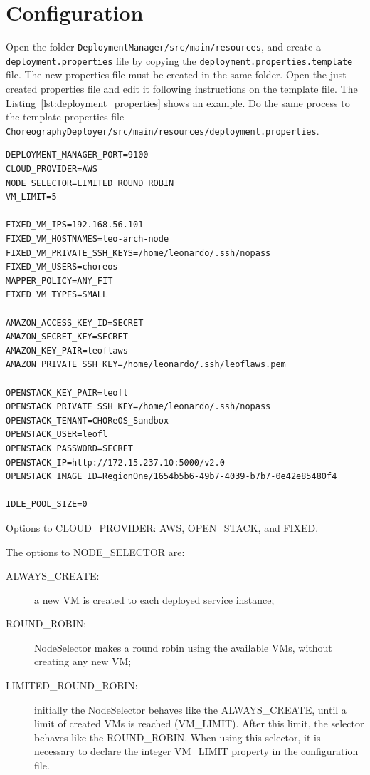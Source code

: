 \section{Configuration}

Open the folder \texttt{DeploymentManager/src/main/resources}, and create a \texttt{deployment.properties} file by copying the \texttt{deployment.properties.template} file. The new properties file must be created in the same folder. Open the just created properties file and edit it following instructions on the template file. The Listing~\ref{lst:deployment_properties} shows an example. Do the same process to the template properties file \texttt{ChoreographyDeployer/src/main/resources/deployment.properties}.

\lstset{
numbers=left
}

{\footnotesize
\begin{lstlisting}[caption=deployment.properties example,label=lst:deployment_properties] 
DEPLOYMENT_MANAGER_PORT=9100
CLOUD_PROVIDER=AWS
NODE_SELECTOR=LIMITED_ROUND_ROBIN
VM_LIMIT=5

FIXED_VM_IPS=192.168.56.101
FIXED_VM_HOSTNAMES=leo-arch-node
FIXED_VM_PRIVATE_SSH_KEYS=/home/leonardo/.ssh/nopass
FIXED_VM_USERS=choreos
MAPPER_POLICY=ANY_FIT
FIXED_VM_TYPES=SMALL

AMAZON_ACCESS_KEY_ID=SECRET
AMAZON_SECRET_KEY=SECRET
AMAZON_KEY_PAIR=leoflaws
AMAZON_PRIVATE_SSH_KEY=/home/leonardo/.ssh/leoflaws.pem

OPENSTACK_KEY_PAIR=leofl
OPENSTACK_PRIVATE_SSH_KEY=/home/leonardo/.ssh/nopass
OPENSTACK_TENANT=CHOReOS_Sandbox
OPENSTACK_USER=leofl
OPENSTACK_PASSWORD=SECRET
OPENSTACK_IP=http://172.15.237.10:5000/v2.0
OPENSTACK_IMAGE_ID=RegionOne/1654b5b6-49b7-4039-b7b7-0e42e85480f4

IDLE_POOL_SIZE=0

\end{lstlisting}
}

Options to CLOUD\_PROVIDER: AWS, OPEN\_STACK, and FIXED.

The options to NODE\_SELECTOR are: 

\begin{description}
\item [ALWAYS\_CREATE:] a new VM is created to each deployed service instance;
\item [ROUND\_ROBIN:] \textsf{NodeSelector} makes a round robin using the available VMs, without creating any new VM;
\item [LIMITED\_ROUND\_ROBIN:] initially the \textsf{NodeSelector} behaves like the ALWAYS\_CREATE, until a limit of created VMs is reached (VM\_LIMIT). After this limit, the selector behaves like the ROUND\_ROBIN. When using this selector, it is necessary to declare the integer VM\_LIMIT property in the configuration file.
\end{description}


